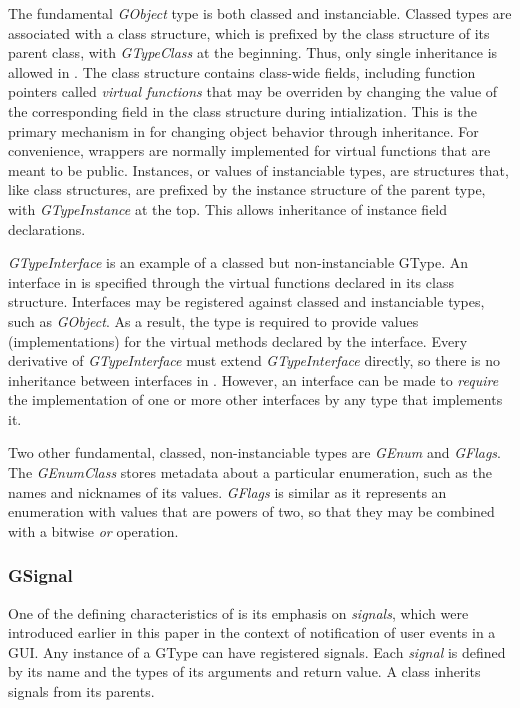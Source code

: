 \documentclass[article]{jss}
\begin{document}
The fundamental \emph{GObject} type is both classed and instanciable. Classed 
types are associated with a class structure, which is prefixed by the class structure 
of its parent class, with \emph{GTypeClass} at the beginning. Thus, only single
inheritance is allowed in .
The class structure contains class-wide fields, including function pointers
called \emph{virtual functions} that may be overriden by changing
the value of the corresponding field in the class structure during intialization.
This is the primary mechanism in  for changing object behavior through
inheritance. For convenience, wrappers are normally implemented for virtual
functions that are meant to be public. Instances, or values of instanciable types, 
are structures that, like class structures, are prefixed by the instance structure
of the parent type, with \emph{GTypeInstance} at the top. 
This allows inheritance of instance field declarations. 

\emph{GTypeInterface} is an example of a classed but non-instanciable GType.
An interface in  is specified through the
virtual functions declared in its class structure. Interfaces may be registered
against classed and instanciable types, such as \emph{GObject}. As a result, the
type is required to provide values (implementations) for the virtual methods 
declared by the interface. Every derivative of \emph{GTypeInterface} must extend
\emph{GTypeInterface} directly, 
so there is no inheritance between interfaces in . However, an 
interface can be made to \emph{require} the implementation of one or more other 
interfaces by any type that implements it.

Two other fundamental, classed, non-instanciable types are \emph{GEnum} and 
\emph{GFlags}. The \emph{GEnumClass} stores metadata about a particular
enumeration, such as the names and nicknames of its values. \emph{GFlags} is
similar as it represents an enumeration with values that are powers of two, 
so that they may be combined with a bitwise \emph{or} operation.

\subsubsection{GSignal}

One of the defining characteristics of  is its emphasis on
\emph{signals}, which were introduced earlier in this paper in the context of
notification of user events in a  GUI. Any instance of a GType can 
have registered signals. Each \emph{signal} is defined by its name and the types
of its arguments and return value. A class inherits signals from its parents.
\end{document}
